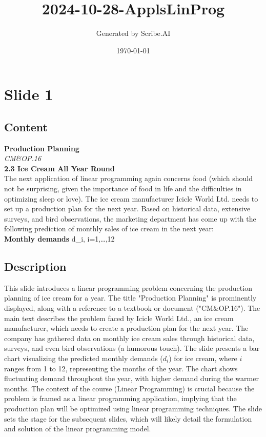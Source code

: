 \documentclass{article}%
\title{2024{-}10{-}28{-}ApplsLinProg}%
\author{Generated by Scribe.AI}%
\date{\today}%
\begin{document}
%
\normalsize%
\maketitle%
\section{Slide 1}%
\label{sec:Slide1}%
\subsection{Content}%

\textbf{Production Planning} \\
\textit{CM\&OP.16} \\
\textbf{2.3 Ice Cream All Year Round} \\
The next application of linear programming again concerns food (which
should not be surprising, given the importance of food in life and the difficulties
in optimizing sleep or love). The ice cream manufacturer Icicle World
Ltd. needs to set up a production plan for the next year. Based on historical
data, extensive surveys, and bird observations, the marketing department has come
up with the following prediction of monthly sales of ice cream in the next
year: \\
 \quad \textbf{Monthly demands } d_i, i=1,\dots,12
%
\subsection{Description}%
This slide introduces a linear programming problem concerning the production planning of ice cream for a year. The title "Production Planning" is prominently displayed, along with a reference to a textbook or document ("CM\&OP.16"). The main text describes the problem faced by Icicle World Ltd., an ice cream manufacturer, which needs to create a production plan for the next year. The company has gathered data on monthly ice cream sales through historical data, surveys, and even bird observations (a humorous touch).  The slide presents a bar chart visualizing the predicted monthly demands ($d_i$) for ice cream, where $i$ ranges from 1 to 12, representing the months of the year. The chart shows fluctuating demand throughout the year, with higher demand during the warmer months. The context of the course (Linear Programming) is crucial because the problem is framed as a linear programming application, implying that the production plan will be optimized using linear programming techniques. The slide sets the stage for the subsequent slides, which will likely detail the formulation and solution of the linear programming model.%
\end{document}
